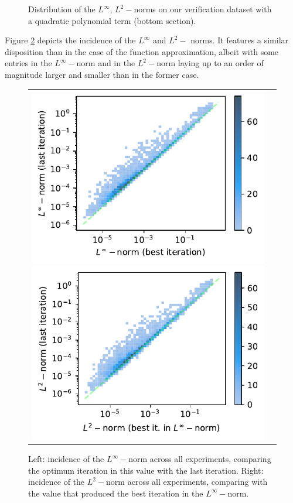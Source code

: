 \documentclass[12pt]{report} %
\begin{document}
\begin{figure}
\begin{tabular}{cccccc}
  \end{tabular}
  \caption{Distribution of the $L^\infty$, $L^2-$norms on our verification dataset
    with a quadratic polynomial term (bottom section).}
  \label{fig:ode-results-overall-poly2}
\end{figure}

Figure \ref{fig:ode-1d-results-incidence-l-norms} depicts the incidence of the $L^\infty$ and $L^2-$ norms. It features a similar disposition than in the case of the function approximation, albeit with some entries in the $L^\infty-$norm and in the $L^2-$norm laying up to an order of magnitude larger and smaller than in the former case.

\begin{figure}[h]
  \hspace*{-2cm}
  \begin{tabular}{cc}
    \includegraphics[width=.6\textwidth]{imagenes/experiments/1d/ode/incidence_of_linf.pdf}
    \includegraphics[width=.6\textwidth]{imagenes/experiments/1d/ode/incidence_of_l2.pdf}
  \end{tabular}
  \caption{Left: incidence of the $L^\infty-$norm across all experiments, comparing the optimum iteration in this value with the last iteration. Right: incidence of the $L^2-$norm across all experiments, comparing with the value that produced the best iteration in the $L^\infty-$norm.}
  \label{fig:ode-1d-results-incidence-l-norms}
\end{figure}
\end{document}
